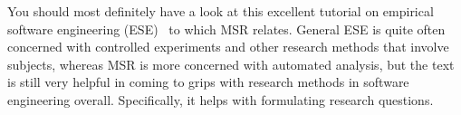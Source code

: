 You should most definitely have a look at this excellent tutorial on
empirical software engineering (ESE)~\cite{Easterbrook07} to which MSR
relates. General ESE is quite often concerned with controlled
experiments and other research methods that involve subjects, whereas
MSR is more concerned with automated analysis, but the text is still
very helpful in coming to grips with research methods in software
engineering overall. Specifically, it helps with formulating research questions.
